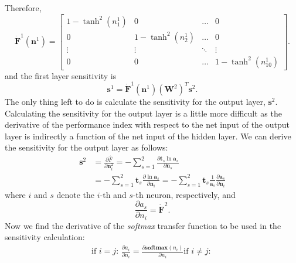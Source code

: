 \documentclass[12pt,halfline,a4paper]{ouparticle}
\begin{document}
Therefore, 
\begin{equation}
\dot{\mathbf{F}}^{1}(\mathbf{n}^{1}) = \begin{bmatrix} 1 - \tanh^{2}(n_{1}^{1}) & 0 & \ldots & 0 \\ 
0 & 1 - \tanh^{2}(n_{2}^{1}) & \ldots & 0 \\
\vdots & \vdots & \ddots & \vdots \\ 
0 & 0 & \ldots & 1 - \tanh^{2}(n_{10}^{1}) \end{bmatrix}.
\end{equation}
and the first layer sensitivity is 
\begin{equation}
\mathbf{s}^{1} = \dot{\mathbf{F}}^{1}(\mathbf{n}^{1})(\mathbf{W}^{2})^{T}\mathbf{s}^{2}.
\end{equation}
The only thing left to do is calculate the sensitivity for the output layer, $\mathbf{s}^{2}$. Calculating the sensitivity for the output layer is a little more difficult as the derivative of the performance index with respect to the net input of the output layer is indirectly a function of the net input of the hidden layer. We can derive the sensitivity for the output layer as follows: 
\begin{equation}
\begin{split}
\mathbf{s}^{2} & = \frac{\partial \hat{F}}{\partial \mathbf{n}_{i}^{2}} = - \sum_{s = 1}^{2} \frac{\partial \mathbf{t}_{s} \ln \mathbf{a}_{s}}{\partial \mathbf{n}_{s}} \\
& = - \sum_{s = 1}^{2} \mathbf{t}_{s} \frac{\partial \ln \mathbf{a}_{s}}{\partial \mathbf{n}_{i}} = - \sum_{s = 1}^{2} \mathbf{t}_{s} \frac{1}{\mathbf{a}_{s}} \frac{\partial \mathbf{a}_{s}}{\partial \mathbf{n}_{i}}
\end{split}
\end{equation}
where $i$ and $s$ denote the $i$-th and $s$-th neuron, respectively, and 
\begin{equation}
\frac{\partial a_{s}}{\partial n_{i}} = \dot{\mathbf{F}}^{2}.
\end{equation}
Now we find the derivative of the \emph{softmax} transfer function to be used in the sensitivity calculation: 
\begin{equation}
\begin{split}
\text{if } i = j\text{: } \frac{\partial a_{i}}{\partial n_{i}} = \frac{\partial \textbf{softmax}(n_{i})}{\partial n_{i}}

\text{if } i \neq j\text{: }
\end{split}
\end{equation}
\end{document}
